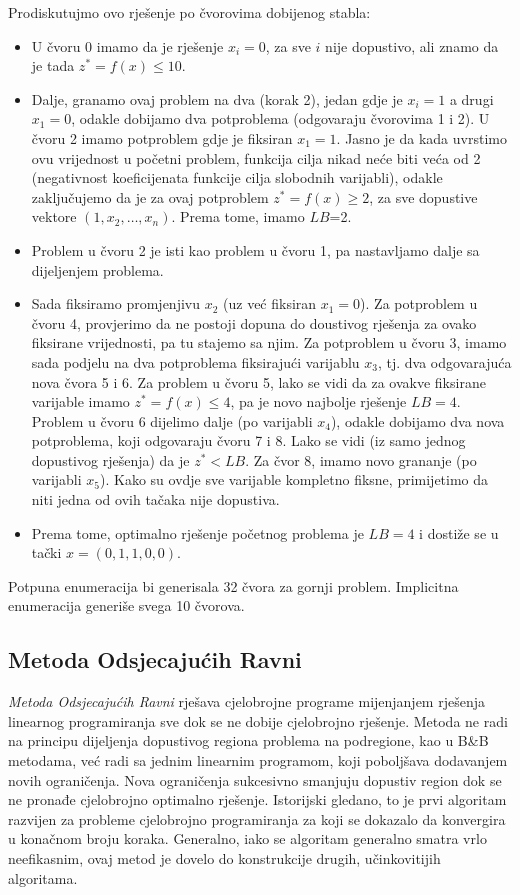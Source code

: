 \documentclass[a4paper, utf8, 11pt, colorlinks]{article}
\begin{document}
Prodiskutujmo ovo rješenje po čvorovima dobijenog stabla:
  \begin{itemize}
      \item U čvoru 0 imamo da je rješenje $x_i = 0$, za sve $i$ nije dopustivo, ali znamo da je tada $z^*=f(x) \leq 10$.
      \item  Dalje, granamo ovaj problem na dva (korak 2), jedan gdje je $x_i=1$ a drugi $x_1=0$, odakle dobijamo dva potproblema (odgovaraju čvorovima 1 i 2). U čvoru 2 imamo potproblem gdje je fiksiran $x_1=1$. Jasno je da kada uvrstimo ovu vrijednost u početni problem, funkcija cilja nikad neće biti veća od 2 (negativnost koeficijenata funkcije cilja slobodnih varijabli), odakle zaključujemo da je za ovaj potproblem $z^*=f(x) \geq 2$, za sve dopustive vektore $(1,x_2,\ldots,x_n)$. Prema tome, imamo $LB$=2. 
      \item Problem u čvoru 2 je isti kao problem u čvoru 1, pa nastavljamo dalje sa dijeljenjem problema. 
      \item Sada fiksiramo promjenjivu $x_2$ (uz već fiksiran $x_1=0$). 
            Za potproblem u čvoru 4, provjerimo da ne postoji dopuna do doustivog rješenja za ovako fiksirane vrijednosti, pa tu stajemo sa njim. Za potproblem u čvoru 3, imamo sada podjelu na dva potproblema fiksirajući varijablu $x_3$, tj. dva odgovarajuća nova čvora 5 i 6. Za problem u čvoru 5, lako se vidi da za ovakve fiksirane varijable imamo 
            $z^*=f(x) \leq 4$, pa je novo najbolje rješenje $LB=4$. Problem u čvoru 6 dijelimo dalje (po varijabli $x_4$), odakle dobijamo dva nova potproblema, koji odgovaraju čvoru 7 i 8. Lako se vidi (iz samo jednog dopustivog rješenja) da je $z^*<LB$.  Za čvor 8, imamo novo grananje (po varijabli $x_5$). Kako su ovdje sve varijable kompletno fiksne, primijetimo da niti jedna od ovih tačaka  nije dopustiva.
            \item Prema tome, optimalno rješenje početnog problema je $LB=4$ i dostiže se u tački $x=(0, 1, 1, 0, 0)$. 
  \end{itemize}
  Potpuna enumeracija bi generisala 32 čvora za gornji problem. Implicitna enumeracija generiše svega 10 čvorova. 
 
\subsection{Metoda Odsjecajućih Ravni}
  
\emph{Metoda Odsjecajućih Ravni} rješava cjelobrojne programe mijenjanjem rješenja linearnog programiranja sve dok se ne dobije cjelobrojno rješenje. Metoda ne radi  na principu dijeljenja dopustivog regiona problema na podregione, kao u B\&B metodama, već radi sa jednim linearnim programom, koji poboljšava dodavanjem novih ograničenja. Nova ograničenja sukcesivno smanjuju dopustiv region dok se ne pronađe cjelobrojno optimalno rješenje.   
 Istorijski gledano, to je prvi algoritam razvijen za probleme cjelobrojno programiranja za koji se dokazalo da konvergira u konačnom broju
koraka. Generalno, iako se algoritam generalno smatra vrlo neefikasnim, ovaj metod je dovelo do konstrukcije drugih, učinkovitijih algoritama.  
  
\end{document}
